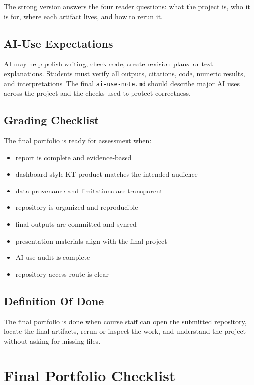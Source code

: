\documentclass[
  letterpaper,
  DIV=11,
  numbers=noendperiod,
  oneside]{scrreprt}
\providecommand{\tightlist}{%
  \setlength{\itemsep}{0pt}\setlength{\parskip}{0pt}}
\begin{document}
The strong version answers the four reader questions: what the project
is, who it is for, where each artifact lives, and how to rerun it.

\section{AI-Use Expectations}\label{ai-use-expectations-17}

AI may help polish writing, check code, create revision plans, or test
explanations. Students must verify all outputs, citations, code, numeric
results, and interpretations. The final \texttt{ai-use-note.md} should
describe major AI uses across the project and the checks used to protect
correctness.

\section{Grading Checklist}\label{grading-checklist-15}

The final portfolio is ready for assessment when:

\begin{itemize}
\tightlist
\item
  report is complete and evidence-based
\item
  dashboard-style KT product matches the intended audience
\item
  data provenance and limitations are transparent
\item
  repository is organized and reproducible
\item
  final outputs are committed and synced
\item
  presentation materials align with the final project
\item
  AI-use audit is complete
\item
  repository access route is clear
\end{itemize}

\section{Definition Of Done}\label{definition-of-done-27}

The final portfolio is done when course staff can open the submitted
repository, locate the final artifacts, rerun or inspect the work, and
understand the project without asking for missing files.

\chapter{Final Portfolio Checklist}\label{final-portfolio-checklist}
\end{document}
